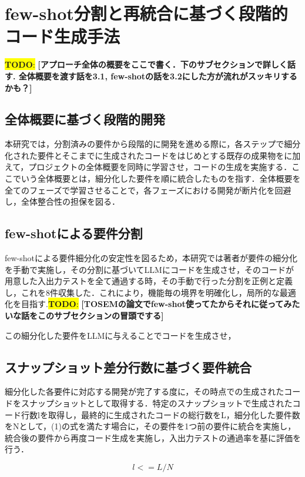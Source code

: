 \documentclass[submit,techrep,noauthor]{ipsj}
\newcommand{\todo}[1]{\colorbox{yellow}{{\bf TODO}:}{\color{red} {\textbf{[#1]}}}}
\begin{document}
\section{few-shot分割と再統合に基づく段階的コード生成手法}

\todo{アプローチ全体の概要をここで書く．下のサブセクションで詳しく話す. 全体概要を渡す話を3.1, few-shotの話を3.2にした方が流れがスッキリするかも？}

\subsection{全体概要に基づく段階的開発}
本研究では，分割済みの要件から段階的に開発を進める際に，各ステップで細分化された要件とそこまでに生成されたコードをはじめとする既存の成果物をに加えて，プロジェクトの全体概要を同時に学習させ，コードの生成を実施する．ここでいう全体概要とは，細分化した要件を順に統合したものを指す．全体概要を全てのフェーズで学習させることで，各フェーズにおける開発が断片化を回避し，全体整合性の担保を図る．

\subsection{few-shotによる要件分割}
few-shotによる要件細分化の安定性を図るため，本研究では著者が要件の細分化を手動で実施し，その分割に基づいてLLMにコードを生成させ，そのコードが用意した入出力テストを全て通過する時，その手動で行った分割を正例と定義し，これを8件収集した．これにより，機能毎の境界を明確化し，局所的な最適化を目指す.\todo{TOSEMの論文でfew-shot使ってたからそれに従ってみたいな話をこのサブセクションの冒頭でする}

この細分化した要件をLLMに与えることでコードを生成させ，

\subsection{スナップショット差分行数に基づく要件統合}
細分化した各要件に対応する開発が完了する度に，その時点での生成されたコードをスナップショットとして取得する．特定のスナップショットで生成されたコード行数lを取得し，最終的に生成されたコードの総行数をL，細分化した要件数をNとして，(1)の式を満たす場合に，その要件を1つ前の要件に統合を実施し，統合後の要件から再度コード生成を実施し，入出力テストの通過率を基に評価を行う．

\begin{equation}
    l <= L / N
\end{equation}
\end{document}
